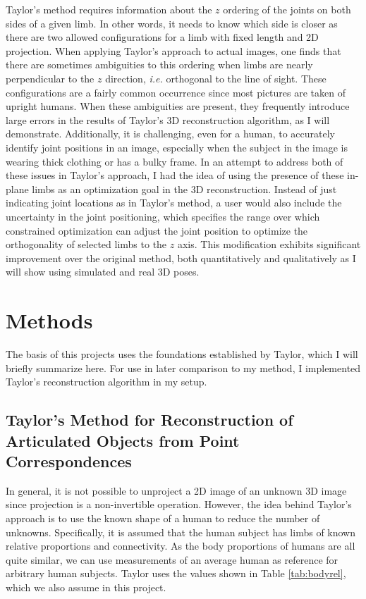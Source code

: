 \documentclass[final]{article}
\begin{document}
\begin{spacing}{1.1}
  Taylor's method requires information about the $z$ ordering of the joints on both sides of a given limb. In other words, it needs to know which side is closer as there are two allowed configurations for a limb with fixed length and 2D projection. When applying Taylor's approach to actual images, one finds that there are sometimes ambiguities to this ordering when limbs are nearly perpendicular to the $z$ direction, \emph{i.e.} orthogonal to the line of sight. These configurations are a fairly common occurrence since most pictures are taken of upright humans. When these ambiguities are present, they frequently introduce large errors in the results of Taylor's 3D reconstruction algorithm, as I will demonstrate. Additionally, it is challenging, even for a human, to accurately identify joint positions in an image, especially when the subject in the image is wearing thick clothing or has a bulky frame. In an attempt to address both of these issues in Taylor's approach, I had the idea of using the presence of these in-plane limbs as an optimization goal in the 3D reconstruction. Instead of just indicating joint locations as in Taylor's method, a user would also include the uncertainty in the joint positioning, which specifies the range over which constrained optimization can adjust the joint position to optimize the orthogonality of selected limbs to the $z$ axis. This modification exhibits significant improvement over the original method, both quantitatively and qualitatively as I will show using simulated and real 3D poses.

\section{Methods}

The basis of this projects uses the foundations established by Taylor, which I will briefly summarize here. For use in later comparison to my method, I implemented Taylor's reconstruction algorithm in my setup.
 
\subsection{Taylor's Method for Reconstruction of Articulated Objects from Point Correspondences}

In general, it is not possible to unproject a 2D image of an unknown 3D image since projection is a non-invertible operation. However, the idea behind Taylor's approach is to use the known shape of a human to reduce the number of unknowns. Specifically, it is assumed that the human subject has limbs of known relative proportions and connectivity. As the body proportions of humans are all quite similar, we can use measurements of an average human as reference for arbitrary human subjects. Taylor uses the values shown in Table \ref{tab:bodyrel}, which we also assume in this project.


\end{spacing}
\end{document}
